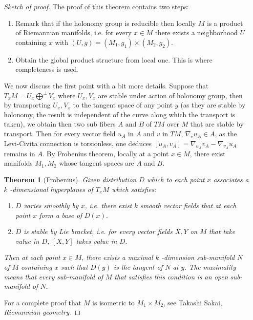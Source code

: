 \documentclass[11pt]{article}
\newtheorem{theorem}{Theorem}
\begin{document}
\begin{proof}[Sketch of proof]
The proof of this theorem contains two steps:
\begin{enumerate}
\item Remark that if the holonomy group is reducible then locally \(M\) is a product of Riemannian
manifolds, i.e. for every \(x\in M\) there exists a neighborhood \(U\) containing \(x\) with
\((U,g)=(M_1,g_1)\times (M_2,g_2)\).
\item Obtain the global product structure from local one. This is where completeness is used.
\end{enumerate}


We now discuss the first point with a bit more details. Suppose that \(T_xM = U_x \bigoplus^\perp V_x\)
where \(U_x, V_x\) are stable under action of holonomy group, then by transporting \(U_x, V_x\) to the
tangent space of any point \(y\) (as they are stable by holonomy, the result is independent of the
curve along which the transport is taken), we obtain then two sub fibers \(A\) and \(B\) of \(TM\) over
\(M\) that are stable by transport. Then for every vector field \(u_A\) in \(A\) and \(v\) in \(TM\),
\(\nabla_v u_A \in A\), as the Levi-Civita connection is torsionless, one deduces
\([u_A,v_A] = \nabla_{u_A}v_A - \nabla_{v_A}u_A\) remains in \(A\). By Frobenius theorem, locally at a
point \(x\in M\), there exist manifolds \(M_1, M_2\) whose tangent spaces are \(A\) and \(B\). 


\begin{theorem}[Frobenius]
\label{thm:Frobenius}
\label{org3e4885c}
Given distribution \(D\) which to each point \(x\) associates a \(k\) -dimensional hyperplanes of \(T_xM\)
which satisfies:
\begin{enumerate}
\item \(D\) varies smoothly by \(x\), i.e. there exist \(k\) smooth vector fields that at each point \(x\)
form a base of \(D(x)\).
\item \(D\) is stable by Lie bracket, i.e. for every vector fields \(X,Y\) on \(M\) that take value in \(D\),
\([X,Y]\) takes value in \(D\).
\end{enumerate}
Then at each point \(x\in M\), there exists a maximal \(k\) -dimension sub-manifold \(N\) of \(M\) containing
\(x\) such that \(D(y)\) is the tangent of \(N\) at \(y\). The maximality means that every sub-manifold of
\(M\) that satisfies this condition is an open sub-manifold of \(N\).
\end{theorem}
For a complete proof that \(M\) is isometric to \(M_1\times M_2\), see Takashi Sakai, \emph{Riemannian geometry}.
\end{proof}
\end{document}
